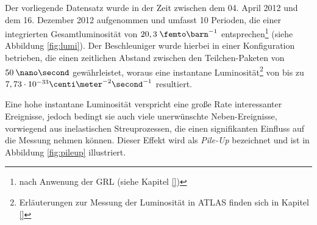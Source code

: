 Der vorliegende Datensatz wurde in der Zeit zwischen dem 04. April 2012 und dem
16. Dezember 2012 aufgenommen und umfasst 10 Perioden, die einer integrierten
Gesamtluminosität von $20,3 \fb^{-1}$ entsprechen\footnote{nach Anwenung der
\ac{GRL} (siehe Kapitel \ref{})} (siehe Abbildung \ref{fig:lumi}). Der
Beschleuniger wurde hierbei in einer Konfiguration betrieben, die einen
zeitlichen Abstand zwischen den Teilchen-Paketen von $50\:\nano\second$
gewährleistet, woraus eine instantane Luminosität\footnote{Erläuterungen zur
Messung der Luminosität in ATLAS finden sich in Kapitel \ref{}} von bis zu
$7,73 \cdot 10^{-33} \centi\meter^{-2}\second^{-1}$ resultiert.

Eine hohe instantane Luminosität verspricht eine große Rate interessanter
Ereignisse, jedoch bedingt sie auch viele unerwünschte Neben-Ereignisse,
vorwiegend aus inelastischen Streuprozessen, die einen signifikanten Einfluss
auf die Messung nehmen können. Dieser Effekt wird als \textit{Pile-Up}
bezeichnet und ist in Abbildung \ref{fig:pileup} illustriert.

